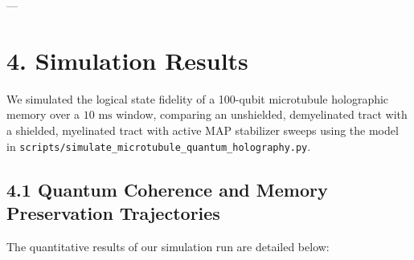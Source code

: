 \documentclass[11pt,twocolumn]{article}
\begin{document}
---

\section{4. Simulation Results}
We simulated the logical state fidelity of a 100-qubit microtubule holographic memory over a $10\text{ ms}$ window, comparing an unshielded, demyelinated tract with a shielded, myelinated tract with active MAP stabilizer sweeps using the model in \texttt{scripts/simulate_microtubule_quantum_holography.py}.

\subsection{4.1 Quantum Coherence and Memory Preservation Trajectories}
The quantitative results of our simulation run are detailed below:
\end{document}
